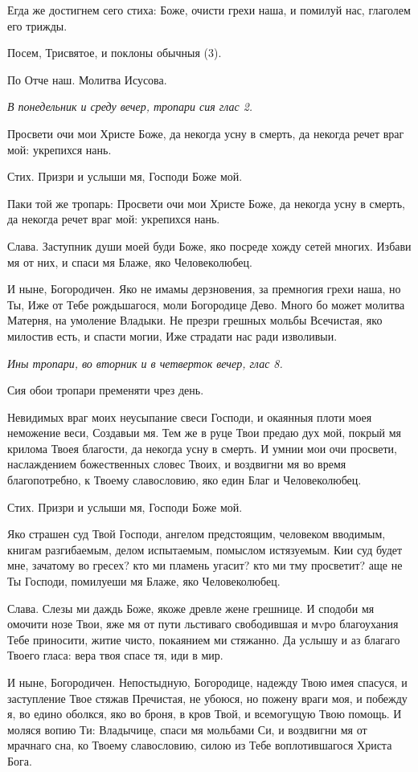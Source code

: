 Егда же достигнем сего стиха: Боже, очисти грехи наша, и помилуй нас, глаголем его трижды.


Посем, Трисвятое, и поклоны обычныя (3).


По Отче наш. Молитва Исусова.


\itshape В понедельник и среду вечер, тропари сия глас 2.\normalfont{}


Просвети очи мои Христе Боже, да некогда усну в смерть, да некогда речет враг мой: укрепихся нань.


Стих. Призри и услыши мя, Господи Боже мой.


Паки той же тропарь: Просвети очи мои Христе Боже, да некогда усну в смерть, да некогда речет враг мой: укрепихся нань.


Слава. Заступник души моей буди Боже, яко посреде хожду сетей многих. Избави мя от них, и спаси мя Блаже, яко Человеколюбец.


И ныне, Богородичен. Яко не имамы дерзновения, за премногия грехи наша, но Ты, Иже от Тебе рождьшагося, моли Богородице Дево. Много бо может молитва Матерня, на умоление Владыки. Не презри грешных мольбы Всечистая, яко милостив есть, и спасти могии, Иже страдати нас ради изволивыи.


\itshape Ины тропари, во вторник и в четверток вечер, глас 8.\normalfont{}


Сия обои тропари пременяти чрез день.


Невидимых враг моих неусыпание свеси Господи, и окаянныя плоти моея неможение веси, Создавыи мя. Тем же в руце Твои предаю дух мой, покрый мя крилома Твоея благости, да некогда усну в смерть. И умнии мои очи просвети, наслаждением божественных словес Твоих, и воздвигни мя во время благопотребно, к Твоему славословию, яко един Благ и Человеколюбец.


Стих. Призри и услыши мя, Господи Боже мой.


Яко страшен суд Твой Господи, ангелом предстоящим, человеком вводимым, книгам разгибаемым, делом испытаемым, помыслом истязуемым. Кии суд будет мне, зачатому во гресех? кто ми пламень угасит? кто ми тму просветит? аще не Ты Господи, помилуеши мя Блаже, яко Человеколюбец.


Слава. Слезы ми даждь Боже, якоже древле жене грешнице. И сподоби мя омочити нозе Твои, яже мя от пути льстиваго свободившая и мvро благоухания Тебе приносити, житие чисто, покаянием ми стяжанно. Да услышу и аз благаго Твоего гласа: вера твоя спасе тя, иди в мир.


И ныне, Богородичен. Непостыдную, Богородице, надежду Твою имея спасуся, и заступление Твое стяжав Пречистая, не убоюся, но пожену враги моя, и побежду я, во едино оболкся, яко во броня, в кров Твой, и всемогущую Твою помощь. И моляся вопию Ти: Владычице, спаси мя мольбами Си, и воздвигни мя от мрачнаго сна, ко Твоему славословию, силою из Тебе воплотившагося Христа Бога.


